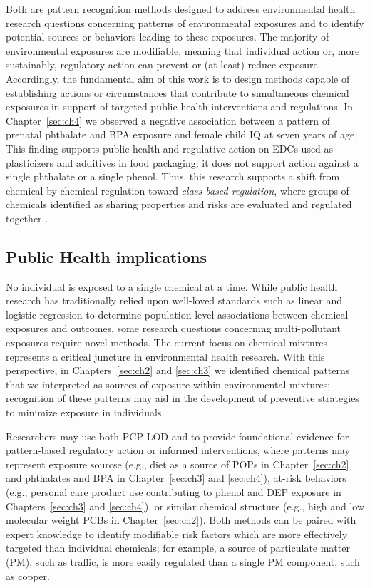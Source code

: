 Both are pattern recognition methods designed to address environmental health research questions concerning patterns of environmental exposures and to identify potential sources or behaviors leading to these exposures. The majority of environmental exposures are modifiable, meaning that individual action or, more sustainably, regulatory action can prevent or (at least) reduce exposure. Accordingly, the fundamental aim of this work is to design methods capable of establishing actions or circumstances that contribute to simultaneous chemical exposures in support of targeted public health interventions and regulations. In Chapter~\ref{sec:ch4} we observed a negative association between a pattern of prenatal phthalate and BPA exposure and female child IQ at seven years of age. This finding supports public health and regulative action on EDCs used as plasticizers and additives in food packaging; it does not support action against a single phthalate or a single phenol. Thus, this research supports a shift from chemical-by-chemical regulation toward \textit{class-based regulation}, where groups of chemicals identified as sharing properties and risks are evaluated and regulated together \citep{cordner2016can}.

\subsection{Public Health implications}\label{sec:fin}
No individual is exposed to a single chemical at a time. While public health research has traditionally relied upon well-loved standards such as linear and logistic regression to determine population-level associations between chemical exposures and outcomes, some research questions concerning multi-pollutant exposures require novel methods. The current focus on chemical mixtures represents a critical juncture in environmental health research. With this perspective, in Chapters~\ref{sec:ch2} and \ref{sec:ch3} we identified chemical patterns that we interpreted as sources of exposure within environmental mixtures; recognition of these patterns may aid in the development of preventive strategies to minimize exposure in individuals.

Researchers may use both PCP-LOD and \bnmf to provide foundational evidence for pattern-based regulatory action or informed interventions, where patterns may represent exposure sourcse (e.g., diet as a source of POPs in Chapter~\ref{sec:ch2} and phthalates and BPA in Chapter~\ref{sec:ch3} and  \ref{sec:ch4}), at-risk behaviors (e.g., personal care product use contributing to phenol and DEP exposure in Chapters~\ref{sec:ch3} and \ref{sec:ch4}), or similar chemical structure (e.g., high and low molecular weight PCBs in Chapter~\ref{sec:ch2}). Both methods can be paired with expert knowledge to identify modifiable risk factors which are more effectively targeted than individual chemicals; for example, a source of particulate matter (PM), such as traffic, is more easily regulated than a single PM component, such as copper.

